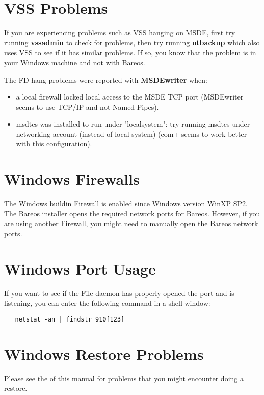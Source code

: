 \section{VSS Problems}

If you are experiencing problems such as VSS hanging on MSDE, first try
running {\bf vssadmin} to check for problems, then try running {\bf
ntbackup} which also uses VSS to see if it has similar problems. If so, you
know that the problem is in your Windows machine and not with Bareos.

The FD hang problems were reported with {\bf MSDEwriter} when:
\begin{itemize}
\item a local firewall locked local access to the MSDE TCP port (MSDEwriter
seems to use TCP/IP and not Named Pipes).
\item msdtcs was installed to run under "localsystem": try running msdtcs
under  networking account (instead of local system) (com+ seems to work
better with this configuration).
\end{itemize}


\section{Windows Firewalls}

The Windows buildin Firewall is enabled since Windows version WinXP SP2.
The Bareos installer opens the required network ports for Bareos.
However, if you are using another Firewall, you might need to manually open the Bareos network ports.

\section{Windows Port Usage}

If you want to see if the File daemon has properly opened the port and is
listening, you can enter the following command in a shell window:

\footnotesize
\begin{verbatim}
   netstat -an | findstr 910[123]
\end{verbatim}
\normalsize


\section{Windows Restore Problems}
Please see the
 of this manual for problems
that you might encounter doing a restore.

